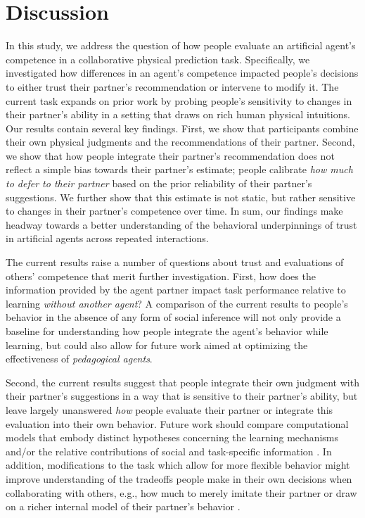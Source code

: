 \documentclass[10pt,letterpaper]{article}
\begin{document}
\section{Discussion}

In this study, we address the question of how people evaluate an artificial agent's competence in a collaborative physical prediction task. Specifically, we investigated how differences in an agent's competence impacted people's decisions to either trust their partner's recommendation or intervene to modify it. The current task expands on prior work by probing people's sensitivity to changes in their partner's ability in a setting that draws on rich human physical intuitions. Our results contain several key findings. First, we show that participants combine their own physical judgments and the recommendations of their partner. Second, we show that how people integrate their partner's recommendation does not reflect a simple bias towards their partner's estimate; people calibrate \textit{how much to defer to their partner} based on the prior reliability of their partner's suggestions. We further show that this estimate is not static, but rather sensitive to changes in their partner's competence over time. In sum, our findings make headway towards a better understanding of the behavioral underpinnings of trust in artificial agents across repeated interactions. 

The current results raise a number of questions about trust and evaluations of others' competence that merit further investigation. First, how does the information provided by the agent partner impact task performance relative to learning \textit{without another agent}? A comparison of the current results to people's behavior in the absence of any form of social inference will not only provide a baseline for understanding how people integrate the agent's behavior while learning, but could also allow for future work aimed at optimizing the effectiveness of \textit{pedagogical agents}. 

Second, the current results suggest that people integrate their own judgment with their partner's suggestions in a way that is sensitive to their partner's ability, but leave largely unanswered \textit{how} people evaluate their partner or integrate this evaluation into their own behavior. Future work should compare computational models that embody distinct hypotheses concerning the learning mechanisms and/or the relative contributions of social and task-specific information \cite{parnamets2020integration}. In addition, modifications to the task which allow for more flexible behavior might improve understanding of the tradeoffs people make in their own decisions when collaborating with others, e.g., how much to merely imitate their partner or draw on a richer internal model of their partner's behavior \cite{charpentier2020neuro}. 
\end{document}
